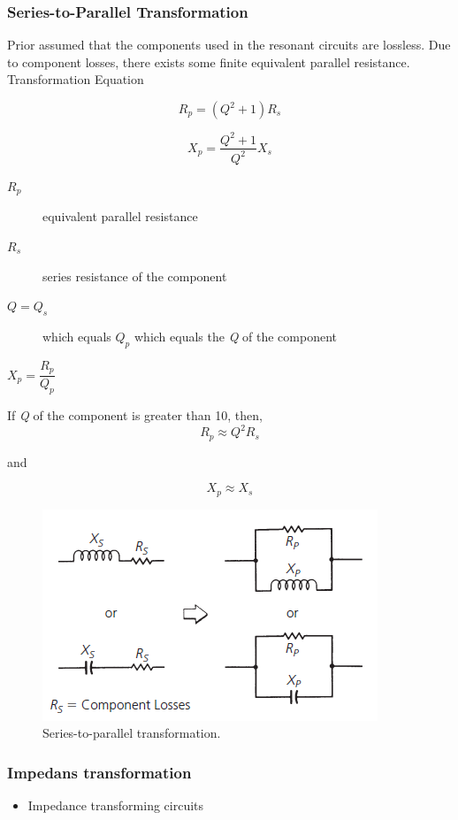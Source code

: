 \subsubsection{Series-to-Parallel Transformation}
Prior assumed that the components used in the resonant circuits are lossless. Due to component losses, there exists some finite equivalent parallel resistance.\\

\noindent Transformation Equation

\begin{equation}
R_p = (Q^2 +1)R_s
\end{equation}

\begin{equation}
X_p = \dfrac{Q^2+1}{Q^2}X_s
\end{equation}

\begin{description}
	\item[$R_p$] equivalent parallel resistance
	\item[$R_s$] series resistance of the component
	\item[$Q = Q_s$] which equals $Q_p$ which equals the \textit{Q} of the component
	\item[$X_p = \dfrac{R_p}{Q_p}$]
\end{description}

\noindent If \textit{Q} of the component is greater than 10, then,
\begin{equation}
R_p \approx Q^2 R_s
\end{equation}

\noindent and

\begin{equation}
X_p \approx X_s
\end{equation}
\begin{figure} [H]
	\centering
	\includegraphics[width=0.5\linewidth]{graphics/23.png}
	\caption{Series-to-parallel transformation.}
\end{figure}
\newpage
\subsubsection{Impedans transformation}
\begin{itemize}
	\item Impedance transforming circuits
\end{itemize}

